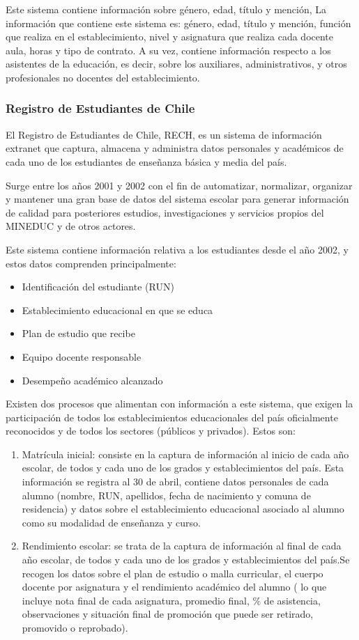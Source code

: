 Este sistema contiene información sobre género, edad, título y mención, 
La información que contiene este sistema es: género, edad, título y mención, función que realiza en el establecimiento, nivel y asignatura que realiza cada docente aula, horas y tipo de contrato. A su vez, contiene información respecto a los asistentes de la educación, es decir, sobre los auxiliares, administrativos, y otros profesionales no docentes del establecimiento. 

\subsubsection{Registro de Estudiantes de Chile}
El Registro de Estudiantes de Chile, RECH, es un sistema de información extranet que captura, almacena y administra datos personales y académicos de cada uno de los estudiantes de enseñanza básica y media del país. 

Surge entre los años 2001 y 2002 con el fin de automatizar, normalizar, organizar y mantener una gran base de datos del sistema escolar para generar información de calidad para posteriores estudios, investigaciones y servicios propios del MINEDUC y de otros actores.

Este sistema contiene información relativa a los estudiantes desde el año 2002, y estos datos comprenden principalmente: 
\begin{itemize}
\item Identificación del estudiante (RUN)
\item Establecimiento educacional en que se educa
\item Plan de estudio que recibe
\item Equipo docente responsable
\item Desempeño académico alcanzado
\end{itemize}

Existen dos procesos que alimentan con información a este sistema, que exigen la participación de todos los establecimientos educacionales del país oficialmente reconocidos y de todos los sectores (públicos y privados). Estos son:
\begin{enumerate}
\item Matrícula inicial: consiste en la captura de información al inicio de cada año escolar, de todos y cada uno de los grados y establecimientos del país. Esta información se registra al 30 de abril, contiene datos personales de cada alumno (nombre, RUN, apellidos, fecha de nacimiento y comuna de residencia) y datos sobre el establecimiento educacional asociado al alumno como su modalidad de enseñanza y curso.
\item Rendimiento escolar: se trata de la captura de información al final de cada año escolar, de todos y cada uno de los grados y establecimientos del país.Se recogen los datos sobre el plan de estudio o malla curricular, el cuerpo docente por asignatura y el rendimiento académico del alumno ( lo que incluye nota final de cada asignatura, promedio final, \% de asistencia, observaciones y situación final de promoción que puede ser retirado, promovido o reprobado).
\end{enumerate}

